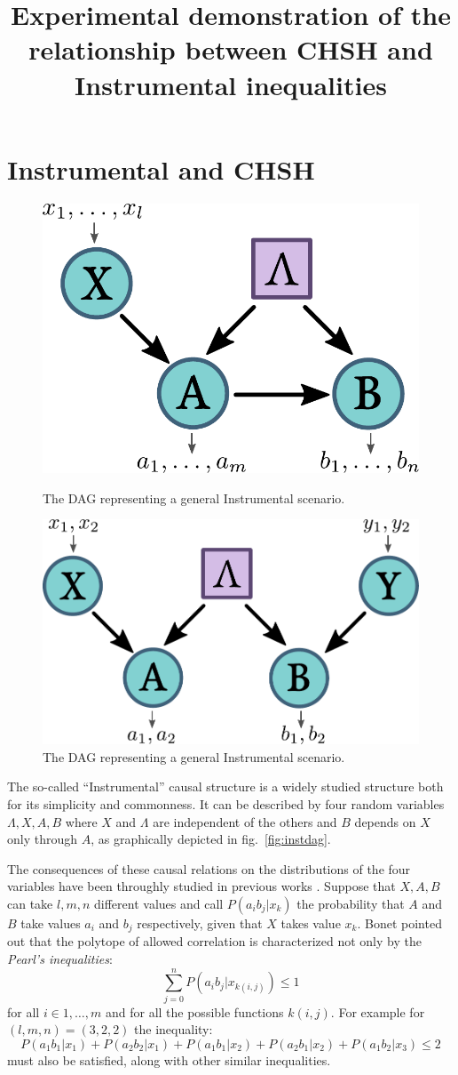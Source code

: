 \documentclass{article}
\title{Experimental demonstration of the relationship between CHSH and Instrumental inequalities}
\begin{document}
\maketitle

\section*{Instrumental and CHSH}
\begin{figure}[h]
    \centering
    \parbox{.4\textwidth}{
        \includegraphics[width=.4\textwidth]{images/instdag.pdf}
        \caption{The DAG representing a general Instrumental scenario.}
        \label{fig:instdag}
    }
    \qquad
    \parbox{.4\textwidth}{
        \includegraphics[width=.4\textwidth]{images/chshdag.pdf}
        \caption{The DAG representing a general Instrumental scenario.}
        \label{fig:chshdag}
    }
\end{figure}

The so-called ``Instrumental'' causal structure is a widely studied
structure both for its simplicity and commonness.
It can be described by four random variables $\Lambda, X, A, B$ where $X$ and
$\Lambda$ are independent of the others and $B$ depends on $X$ only through $A$,
as graphically depicted in fig.~\ref{fig:instdag}.

The consequences of these causal relations on the distributions of the four
variables have been throughly studied in previous works \cite{pearl1995,
bonet2001}.
Suppose that $X, A, B$ can take $l,m,n$ different values and 
call $P(a_i b_j | x_k)$ the probability that $A$ and $B$ take values $a_i$
and $b_j$ respectively, given that $X$ takes value $x_k$.
Bonet \cite{bonet2001} pointed out that the polytope of allowed
correlation is characterized not only by the \emph{Pearl's inequalities}:
\begin{equation}
    \sum_{j=0}^{n} P(a_i b_j|x_{k(i,j)}) \le 1
    \label{eq:pearl_ineq}
\end{equation}
for all $i \in {1,\ldots, m}$ and for all the possible functions $k(i,j)$.
For example for $(l,m,n) = (3,2,2)$ the inequality:
\begin{equation}
    P(a_1 b_1 | x_1) + P(a_2 b_2 | x_1) + 
    P(a_1 b_1 | x_2) + P(a_2 b_1 | x_2) + 
    P(a_1 b_2 | x_3) \le 2
    \label{eq:bonet_ineq}
\end{equation}
must also be satisfied, along with other similar inequalities.
\end{document}
